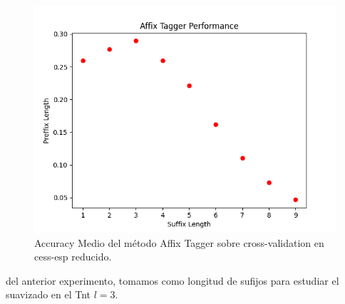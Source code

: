 \documentclass[11pt,a4paper]{report}
\begin{document}
	\begin{figure}[!thb]
		\begin{center}
			\includegraphics[scale=0.6]{images/affix.png}
		\end{center}
		\caption{ Accuracy Medio del método Affix Tagger sobre cross-validation en cess-esp reducido.}
		\label{affix}
	\end{figure}

	del anterior experimento, tomamos como longitud de sufijos para estudiar el suavizado en el Tnt $l=3$.
\end{document}
